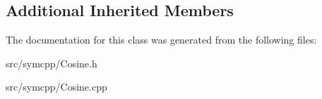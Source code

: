 \subsection*{Additional Inherited Members}


The documentation for this class was generated from the following files\+:\begin{DoxyCompactItemize}
\item 
src/symcpp/Cosine.\+h\item 
src/symcpp/Cosine.\+cpp\end{DoxyCompactItemize}
